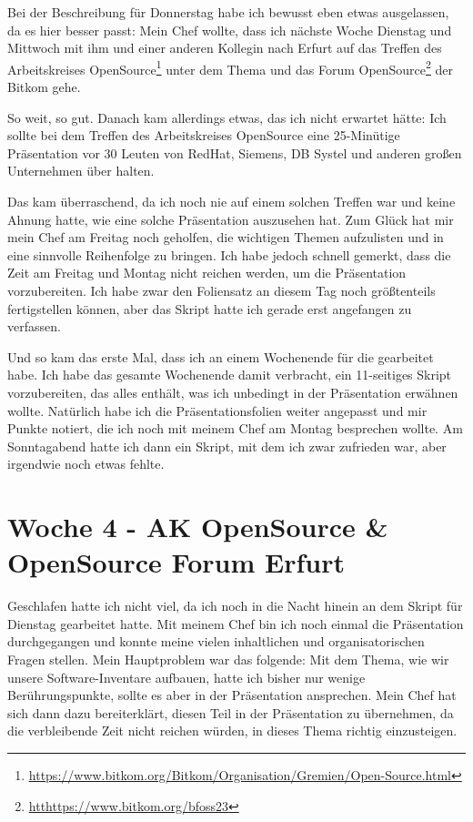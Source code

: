 Bei der Beschreibung für Donnerstag habe ich bewusst eben etwas ausgelassen, da es hier besser passt:
Mein Chef wollte, dass ich nächste Woche Dienstag und Mittwoch mit ihm und einer anderen Kollegin nach Erfurt auf das
Treffen des Arbeitskreises OpenSource\footnote{\url{https://www.bitkom.org/Bitkom/Organisation/Gremien/Open-Source.html}} unter dem Thema  und das
Forum OpenSource\footnote{\url{htthttps://www.bitkom.org/bfoss23}} der Bitkom gehe.

So weit, so gut.
Danach kam allerdings etwas, das ich nicht erwartet hätte: Ich sollte bei dem Treffen des Arbeitskreises OpenSource eine 25-Minütige Präsentation vor 30 Leuten von RedHat, Siemens, DB Systel und anderen großen Unternehmen über  halten.

Das kam überraschend, da ich noch nie auf einem solchen Treffen war und keine Ahnung hatte, wie eine solche Präsentation auszusehen hat.
Zum Glück hat mir mein Chef am Freitag noch geholfen, die wichtigen Themen aufzulisten und in eine sinnvolle Reihenfolge zu bringen.
Ich habe jedoch schnell gemerkt, dass die Zeit am Freitag und Montag nicht reichen werden, um die Präsentation vorzubereiten.
Ich habe zwar den Foliensatz an diesem Tag noch größtenteils fertigstellen können, aber das Skript hatte ich gerade erst angefangen zu verfassen.

Und so kam das erste Mal, dass ich an einem Wochenende für die \metaeffekt gearbeitet habe.
Ich habe das gesamte Wochenende damit verbracht, ein 11-seitiges Skript vorzubereiten, das alles enthält, was ich unbedingt in der Präsentation erwähnen wollte.
Natürlich habe ich die Präsentationsfolien weiter angepasst und mir Punkte notiert, die ich noch mit meinem Chef am Montag besprechen wollte.
Am Sonntagabend hatte ich dann ein Skript, mit dem ich zwar zufrieden war, aber irgendwie noch etwas fehlte.


\section{Woche 4 - AK OpenSource \& OpenSource Forum Erfurt} \label{sec:bericht-wo-4}

Geschlafen hatte ich nicht viel, da ich noch in die Nacht hinein an dem Skript für Dienstag gearbeitet hatte.
Mit meinem Chef bin ich noch einmal die Präsentation durchgegangen und konnte meine vielen inhaltlichen und organisatorischen Fragen stellen.
Mein Hauptproblem war das folgende: Mit dem Thema, wie wir unsere Software-Inventare aufbauen, hatte ich bisher nur wenige Berührungspunkte, sollte es aber in der Präsentation ansprechen.
Mein Chef hat sich dann dazu bereiterklärt, diesen Teil in der Präsentation zu übernehmen, da die verbleibende Zeit nicht reichen würden, in dieses Thema richtig einzusteigen.

